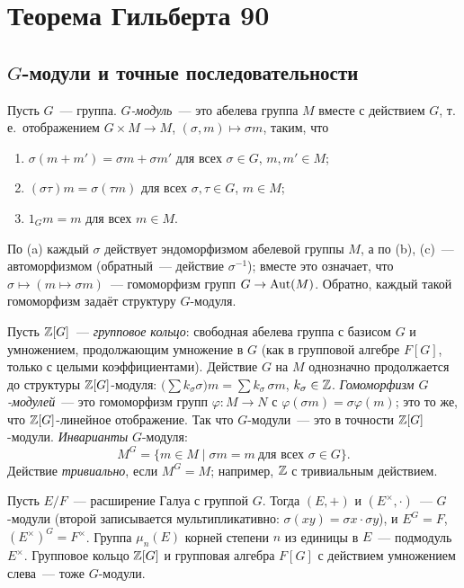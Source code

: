 \section{Теорема Гильберта 90}

\subsection*{$G$-модули и точные последовательности}

Пусть $G$~--- группа. \emph{$G$-модуль}~--- это абелева группа $M$ вместе с действием $G$, т.\,е.\ отображением
$G\times M\to M$, $(\sigma,m)\mapsto\sigma m$, таким, что
\begin{enumerate}[label=\textup{(\alph*)}]
\item $\sigma(m+m')=\sigma m+\sigma m'$ для всех $\sigma\in G$, $m,m'\in M$;
\item $(\sigma\tau)m=\sigma(\tau m)$ для всех $\sigma,\tau\in G$, $m\in M$;
\item $1_Gm=m$ для всех $m\in M$.
\end{enumerate}
По (a) каждый $\sigma$ действует эндоморфизмом абелевой группы $M$, а по (b), (c)~--- автоморфизмом (обратный~---
действие $\sigma^{-1}$); вместе это означает, что $\sigma\mapsto(m\mapsto\sigma m)$~--- гомоморфизм групп $G\to\operatorname{Aut}(M)$.
Обратно, каждый такой гомоморфизм задаёт структуру $G$-модуля.

Пусть $\mathbb Z[G]$~--- \emph{групповое кольцо}: свободная абелева группа с базисом $G$ и умножением, продолжающим умножение в
$G$ (как в групповой алгебре $F[G]$, только с целыми коэффициентами). Действие $G$ на $M$ однозначно продолжается до
структуры $\mathbb Z[G]$-модуля: $\bigl(\sum k_\sigma\sigma\bigr)m=\sum k_\sigma\,\sigma m$, $k_\sigma\in\mathbb Z$. \emph{Гомоморфизм
$G$-модулей}~--- это гомоморфизм групп $\varphi\colon M\to N$ с $\varphi(\sigma m)=\sigma\varphi(m)$; это то же, что
$\mathbb Z[G]$-линейное отображение. Так что $G$-модули~--- это в точности $\mathbb Z[G]$-модули. \emph{Инварианты} $G$-модуля:
\[
M^G=\{m\in M\mid \sigma m=m\ \text{для всех }\sigma\in G\}.
\]
Действие \emph{тривиально}, если $M^G=M$; например, $\mathbb Z$ с тривиальным действием.

\begin{example}[5.20]
Пусть $E/F$~--- расширение Галуа с группой $G$. Тогда $(E,+)$ и $(E^\times,\cdot)$~--- $G$-модули (второй записывается
мультипликативно: $\sigma(xy)=\sigma x\cdot\sigma y$), и $E^G=F$, $(E^\times)^G=F^\times$. Группа $\mu_n(E)$ корней степени $n$
из единицы в $E$~--- подмодуль $E^\times$. Групповое кольцо $\mathbb Z[G]$ и групповая алгебра $F[G]$ с действием умножением слева~---
тоже $G$-модули.
\end{example}

